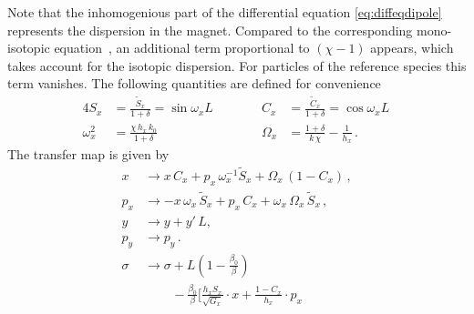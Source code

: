 Note that the inhomogenious part of the differential equation \eqref{eq:diffeqdipole} represents the dispersion in the magnet. Compared to the corresponding mono-isotopic equation~\cite{}, an additional term proportional to $(\chi-1)$ appears, which takes account for the isotopic dispersion. For particles of the reference species this term vanishes. 
%
%
The following quantities are defined for convenience 
\begin{alignat}{4}
S_x &= \frac{\tilde{S}_x}{1+\delta} = \sin \omega_x L \quad \quad \quad &C_x &= \frac{\tilde{C}_x}{1+\delta} = \cos \omega_x L \, \\ \omega_x^2 &= \frac{\chi \, h_x \, k_0}{1+\delta}   &\Omega_x &= \frac{1+\delta}{k \,\chi} - \frac{1}{h_x} \, .
\end{alignat}
%
The transfer map is given by
\begin{align}
x &\rightarrow x \, C_x + p_x \, \omega_x^{-1} \tilde{S}_x + \Omega_x \, \left(1 - C_x \right) \, , \\
p_x &\rightarrow - x \, \omega_x \, \tilde{S}_x + p_x \, C_x + \omega_x \,   \Omega_x \, \tilde{S}_x \, , \\ 
y &\rightarrow y + y' \, L , \\
p_y &\rightarrow p_y \, . \\ 
\sigma &\rightarrow \sigma + L\left(1 - \frac{\beta_0}{\beta}\right) \\
  & \qquad\, -\frac{\beta_0}{\beta} \Bigg[ \frac{h_x S_x}{\sqrt{G_x}} \cdot x + \frac{1-C_x}{h_x} \cdot p_x

\end{align}
